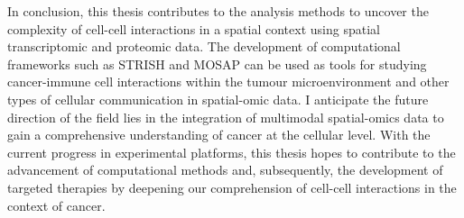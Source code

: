 In conclusion, this thesis contributes to the analysis methods to uncover the complexity of cell-cell interactions in a spatial context using spatial transcriptomic and proteomic data. The development of computational frameworks such as STRISH and MOSAP can be used as tools for studying cancer-immune cell interactions within the tumour microenvironment and other types of cellular communication in spatial-omic data. I anticipate the future direction of the field lies in the integration of multimodal spatial-omics data to gain a comprehensive understanding of cancer at the cellular level. With the current progress in experimental platforms, this thesis hopes to contribute to the advancement of computational methods and, subsequently, the development of targeted therapies by deepening our comprehension of cell-cell interactions in the context of cancer.  

%